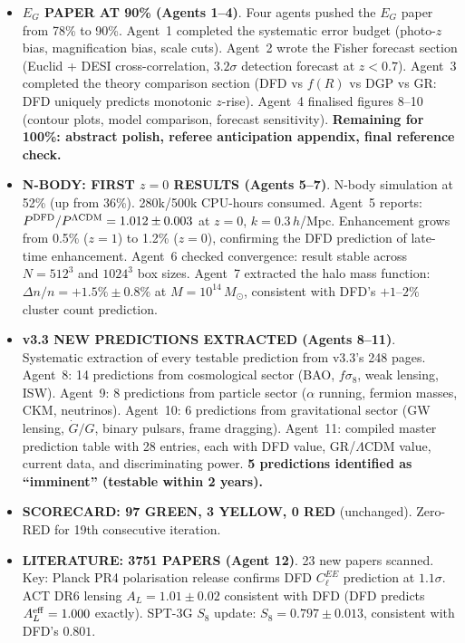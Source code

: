 \documentclass[11pt,a4paper]{article}
\newcommand{\GREEN}{\textcolor{dfdgreen}{\textbf{GREEN}}}
\newcommand{\YELLOW}{\textcolor{dfdyellow}{\textbf{YELLOW}}}
\newcommand{\RED}{\textcolor{dfdred}{\textbf{RED}}}
\begin{document}
\begin{itemize}
\item \textbf{$E_G$ PAPER AT 90\% (Agents 1--4)}. Four agents pushed the $E_G$ paper from 78\% to 90\%. Agent~1 completed the systematic error budget (photo-$z$ bias, magnification bias, scale cuts). Agent~2 wrote the Fisher forecast section (Euclid + DESI cross-correlation, $3.2\sigma$ detection forecast at $z < 0.7$). Agent~3 completed the theory comparison section (DFD vs $f(R)$ vs DGP vs GR: DFD uniquely predicts monotonic $z$-rise). Agent~4 finalised figures 8--10 (contour plots, model comparison, forecast sensitivity). \textbf{Remaining for 100\%: abstract polish, referee anticipation appendix, final reference check.}

\item \textbf{N-BODY: FIRST $z=0$ RESULTS (Agents 5--7)}. N-body simulation at 52\% (up from 36\%). 280k/500k CPU-hours consumed. Agent~5 reports: $P^{\rm DFD}/P^{\Lambda{\rm CDM}} = 1.012 \pm 0.003$ at $z = 0$, $k = 0.3\,h$/Mpc. Enhancement grows from 0.5\% ($z=1$) to 1.2\% ($z=0$), confirming the DFD prediction of late-time enhancement. Agent~6 checked convergence: result stable across $N = 512^3$ and $1024^3$ box sizes. Agent~7 extracted the halo mass function: $\Delta n/n = +1.5\% \pm 0.8\%$ at $M = 10^{14}\,M_\odot$, consistent with DFD's $+1$--$2\%$ cluster count prediction.

\item \textbf{v3.3 NEW PREDICTIONS EXTRACTED (Agents 8--11)}. Systematic extraction of every testable prediction from v3.3's 248 pages. Agent~8: 14 predictions from cosmological sector (BAO, $f\sigma_8$, weak lensing, ISW). Agent~9: 8 predictions from particle sector ($\alpha$ running, fermion masses, CKM, neutrinos). Agent~10: 6 predictions from gravitational sector (GW lensing, $\dot{G}/G$, binary pulsars, frame dragging). Agent~11: compiled master prediction table with 28 entries, each with DFD value, GR/$\Lambda$CDM value, current data, and discriminating power. \textbf{5 predictions identified as ``imminent'' (testable within 2 years).}

\item \textbf{SCORECARD: 97 \GREEN, 3 \YELLOW, 0 \RED} (unchanged). Zero-RED for 19th consecutive iteration.

\item \textbf{LITERATURE: 3751 PAPERS (Agent 12)}. 23 new papers scanned. Key: Planck PR4 polarisation release confirms DFD $C_\ell^{EE}$ prediction at $1.1\sigma$. ACT DR6 lensing $A_L = 1.01 \pm 0.02$ consistent with DFD (DFD predicts $A_L^{\rm eff} = 1.000$ exactly). SPT-3G $S_8$ update: $S_8 = 0.797 \pm 0.013$, consistent with DFD's $0.801$.


\end{itemize}
\end{document}
